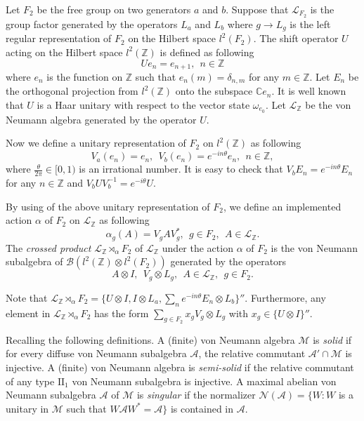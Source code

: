 \documentclass[12pt]{article}
\begin{document}
 Let $F_{2}$ be the free group on two
generators $a$ and $b$. Suppose that $\mathcal{L}_{F_{2}}$ is the
group factor generated by the operators $L_{a}$ and $L_{b}$ where
$g\rightarrow L_{g}$ is the left regular representation of $F_{2}$
on the Hilbert space $l^{2}(F_{2})$. The shift operator $U$ acting
on the Hilbert space $l^{2}(\mathbb{Z})$ is defined as following
$$Ue_{n}=e_{n+1}, \   \ n \in\mathbb{Z}$$
where $e_{n}$ is the function on $\mathbb{Z}$ such that
$e_{n}(m)=\delta_{n,m}$ for any $m\in\mathbb{Z}$. Let $E_{n}$ be the
orthogonal projection from $l^{2}(\mathbb{Z})$ onto the subspace
$\mathbb{C}e_{n}$. It is well known that $U$ is a Haar unitary with
respect to the vector state $\omega_{e_{0}}$. Let
$\mathcal{L}_{\mathbb{Z}}$ be the von Neumann algebra generated by
the operator $U$.

Now we define a unitary representation of $F_{2}$ on
$l^{2}(\mathbb{Z})$ as following
$$V_{a}(e_{n})=e_{n},\   \ V_{b}(e_{n})=e^{-in\theta}e_{n},\   \ n\in\mathbb{Z},$$
where $\frac{\theta}{2\pi}\in [0,1)$ is an irrational number.
It is easy to check that $V_{b}E_{n}=e^{-in\theta}E_{n}$ for any $n\in\mathbb{Z}$ and $V_{b}UV_{b}^{-1}=e^{-i\theta}U$.

By using of the above unitary representation of $F_{2}$, we define
an implemented action $\alpha$ of $F_{2}$ on
$\mathcal{L}_{\mathbb{Z}}$ as following
$$\alpha_{g}(A)=V_{g}AV_{g}^{*},\   \ g\in F_{2},\  \ A\in\mathcal{L}_{\mathbb{Z}}.$$
The {\it crossed product}
$\mathcal{L}_{\mathbb{Z}}\rtimes_{\alpha}F_{2}$ of
$\mathcal{L}_{\mathbb{Z}}$ under the action $\alpha$ of $F_{2}$ is
the von Neumann subalgebra of $\mathcal{B}(l^{2}(\mathbb{Z})\otimes
l^{2}(F_{2}))$ generated by the operators
$$A\otimes I, \   \ V_{g}\otimes L_{g},\   \ A\in\mathcal{L}_{\mathbb{Z}},\   \ g\in F_{2}.$$

Note that $\mathcal{L}_{\mathbb{Z}}\rtimes_{\alpha}F_{2}= \{U\otimes
I,I\otimes L_{a}, \sum_{n}e^{-in\theta}E_{n}\otimes L_{b}\}''$.
Furthermore, any element in
$\mathcal{L}_{\mathbb{Z}}\rtimes_{\alpha}F_{2}$ has the form
$\sum_{g\in F_{2}}x_{g}V_{g}\otimes L_{g}$ with $x_{g}\in\{U\otimes
I\}''$.

Recalling the following definitions. A (finite) von Neumann algebra
$\mathcal{M}$ is {\it solid} if for every diffuse von Neumann
subalgebra $\mathcal{A}$, the relative commutant
$\mathcal{A}'\cap\mathcal{M}$ is injective. A (finite) von Neumann
algebra is {\it semi-solid} if the relative commutant of any type
$\mathrm{II}_{1}$ von Neumann subalgebra is injective. A maximal
abelian von Neumann subalgebra $\mathcal{A}$ of $\mathcal{M}$ is
{\it singular} if the normalizer $\mathcal{N}(\mathcal{A})=\{W:W$ is
a unitary in $\mathcal{M}$ such that
$W\mathcal{A}W^{*}=\mathcal{A}\}$ is contained in $\mathcal{A}$.
\end{document}
